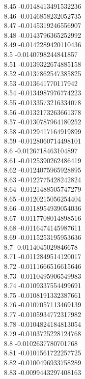 {8.45	-0.0148413491532236\\
8.46	-0.0146858232052735\\
8.47	-0.0145319246556907\\
8.48	-0.0143796365252992\\
8.49	-0.0142289420110436\\
8.5	-0.0140798244841857\\
8.51	-0.0139322674885158\\
8.52	-0.0137862547385825\\
8.53	-0.013641770117942\\
8.54	-0.0134987976774223\\
8.55	-0.0133573216334078\\
8.56	-0.0132173263661378\\
8.57	-0.0130787964180252\\
8.58	-0.0129417164919899\\
8.59	-0.0128060714498101\\
8.6	-0.0126718463104897\\
8.61	-0.0125390262486419\\
8.62	-0.0124075965928895\\
8.63	-0.0122775428242824\\
8.64	-0.0121488505747279\\
8.65	-0.0120215056254404\\
8.66	-0.0118954939054036\\
8.67	-0.0117708014898516\\
8.68	-0.0116474145987611\\
8.69	-0.0115253195953636\\
8.7	-0.0114045029846678\\
8.71	-0.0112849514120017\\
8.72	-0.0111666516615646\\
8.73	-0.0110495906549983\\
8.74	-0.0109337554499691\\
8.75	-0.0108191332387661\\
8.76	-0.0107057113469139\\
8.77	-0.0105934772317982\\
8.78	-0.0104824184813054\\
8.79	-0.0103725228124768\\
8.8	-0.0102637780701768\\
8.81	-0.0101561722257725\\
8.82	-0.0100496933758289\\
8.83	-0.0099443297408163\\
}
